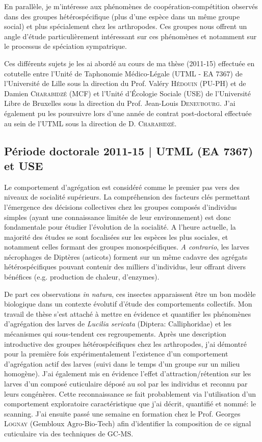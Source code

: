 \documentclass[a4paper,11pt,fleqn]{book} %
\begin{document}
En parallèle, je m’intéresse aux phénomènes de coopération-compétition observés dans des groupes hétérospécifique (plus d’une espèce dans un même groupe social) et plus spécialement chez les arthropodes. Ces groupes nous offrent un angle d'étude particulièrement intéressant sur ces phénomènes et notamment sur le processus de spéciation sympatrique.

Ces différents sujets je les ai abordé au cours de ma thèse (2011-15) effectuée en cotutelle entre l'Unité de Taphonomie Médico-Légale (UTML - EA 7367) de l'Université de Lille sous la direction du Prof. Valéry \textsc{Hédouin} (PU-PH) et de Damien \textsc{Charabidzé} (MCF) et l'Unité d'Écologie Sociale (USE) de l'Université Libre de Bruxelles sous la direction du Prof. Jean-Louis \textsc{Deneubourg}. J'ai également pu les poursuivre lors d'une année de contrat post-doctoral effectuée au sein de l'UTML sous la direction de D. \textsc{Charabidzé}.

\subsection{Période doctorale 2011-15 | UTML (EA 7367) et USE}
Le comportement d'agrégation est considéré comme le premier pas vers des niveaux de socialité supérieurs. La compréhension des facteurs clés permettant l’émergence des décisions collectives chez les groupes composés d’individus simples (ayant une connaissance limitée de leur environnement) est donc fondamentale pour étudier l’évolution de la socialité. A l'heure actuelle, la majorité des études se sont focalisées sur les espèces les plus sociales, et notamment celles formant des groupes monospécifiques. \textit{A contrario}, les larves nécrophages de Diptères (asticots) forment sur un même cadavre des agrégats hétérospécifiques pouvant contenir des milliers d'individus, leur offrant divers bénéfices (e.g. production de chaleur, d’enzymes). 

De part ces observations \textit{in natura}, ces insectes apparaissent être un bon modèle biologique dans un contexte évolutif d'étude des comportements collectifs. Mon travail de thèse s'est attaché à mettre en évidence et quantifier les phénomènes d'agrégation des larves de \textit{Lucilia sericata} (Diptera: Calliphoridae) et les mécanismes qui sous-tendent ces regroupements. Après une description introductive des groupes hétérospécifiques chez les arthropodes, j'ai démontré pour la première fois expérimentalement l'existence d'un comportement d’agrégation actif des larves (suivi dans le temps d'un groupe sur un milieu homogène). J'ai également mis en évidence l'effet d'attraction/rétention sur les larves d'un composé cuticulaire déposé au sol par les individus et reconnu par leurs congénères. Cette reconnaissance se fait probablement via l'utilisation d'un comportement exploratoire caractéristique que j'ai décrit, quantifié et nommé: le scanning. J'ai ensuite passé une semaine en formation chez le Prof. Georges \textsc{Lognay} (Gembloux Agro-Bio-Tech) afin d'identifier la composition de ce signal cuticulaire via des techniques de GC-MS.
\end{document}
